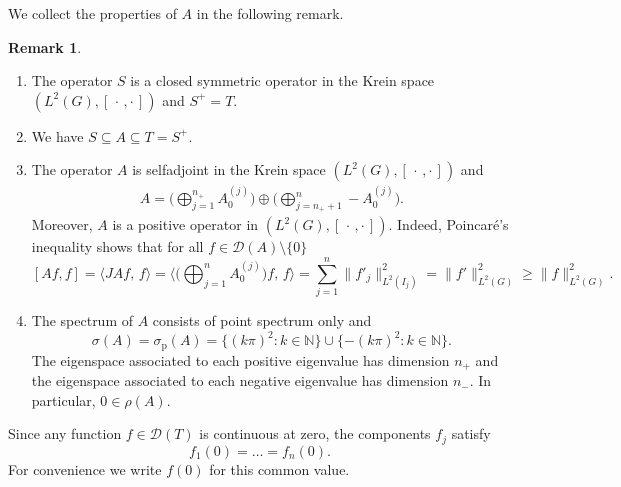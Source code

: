 \documentclass{article}
\numberwithin{equation}{section}
\theoremstyle{definition}
\newtheorem{remark}[theorem]{Remark}
\newcommand{\kip}{[\,\cdot\, , \cdot\,]}
\newcommand{\N}{\mathbb{N}}
\newcommand{\mD}{\mathcal{D}}
\newcommand{\scalar}[2]{\langle#1,\, #2\rangle}
\newcommand{\pointspec}{\sigma_{\mathrm p}}
\newcommand{\Aj}[1][j]{A^{(#1)}}  %
\newcommand{\AK}{A}
\newcommand{\SK}{S}
\newcommand{\TK}{T}
\begin{document}
We collect the properties of $A$ in the following remark.
\begin{remark}
\label{rem:ST}

\begin{enumerate}[label={(\roman*)}]
\addtolength{\itemsep}{-.2\baselineskip}
   \item
   \label{item:ST:i} 
   The operator $\SK$ is a closed symmetric operator in the Krein space $(L^2(G), \kip)$ and $\SK^+ = \TK$.
   
   \item\label{item:ST:ii} 
   We have $\SK \subseteq \AK \subseteq \TK = \SK^+$.
   
   \item\label{item:ST:iii} 
   The operator $\AK$ is selfadjoint in the Krein space $(L^2(G), \kip)$ and
   \begin{align*}
   	\AK = 
   	\Big( \bigoplus_{j=1}^{n_+} \Aj_0 \Big) \oplus
   	\Big( \bigoplus_{j=n_+ + 1}^n -\Aj_0 \Big).
   \end{align*}
   Moreover, $A$ is a positive operator in $(L^2(G), \kip)$.
   Indeed, Poincar\'e's inequality shows that for all $f\in\mD(A)\setminus \{0\}$
   $$
    [Af,f]=   \scalar{JAf}{f} = \scalar{	\Big( \bigoplus_{j=1}^{n} \Aj_0 \Big) f}{f} 
      = \sum_{j=1}^n  \| f'_j \|_{L^2(I_j)}^2  
     = \| f' \|_{L^2(G)}^2 
      \ge \| f \|_{L^2(G)}^2. 
   $$
   
   \item\label{item:ST:iv} 
   The spectrum of $\AK$ consists of point spectrum only and 
   \begin{equation}
   \label{eq;pointspecA}
   	\sigma(\AK) = \pointspec(\AK) = \{ (k\pi)^2  : k\in\N \} \cup \{ -(k\pi)^2  : k\in\N \}.
   \end{equation}
   The eigenspace associated to each positive eigenvalue has dimension $n_+$ and the eigenspace associated to each negative eigenvalue has dimension $n_-$. In particular, $0 \in \rho(A)$.
\end{enumerate}
\end{remark}

Since any function $f\in \mD(\TK)$ is continuous at zero, the components $f_j$ satisfy
\begin{equation*}
   f_1(0) = \dots = f_n(0).
\end{equation*}
For convenience we write $f(0)$ for this common value.
\end{document}
